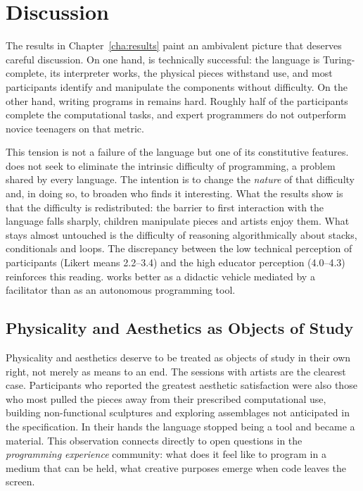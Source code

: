 
\chapter{Discussion}
\label{cha:discussion}

The results in Chapter~\ref{cha:results} paint an ambivalent picture that deserves careful discussion.
On one hand, \sculpt is technically successful: the language is Turing-complete, its interpreter works, the physical pieces withstand use, and most participants identify and manipulate the components without difficulty.
On the other hand, writing programs in \sculpt remains hard.
Roughly half of the participants complete the computational tasks, and expert programmers do not outperform novice teenagers on that metric.

This tension is not a failure of the language but one of its constitutive features.
\sculpt does not seek to eliminate the intrinsic difficulty of programming, a problem shared by every language.
The intention is to change the \emph{nature} of that difficulty and, in doing so, to broaden who finds it interesting.
What the results show is that the difficulty is redistributed: the barrier to first interaction with the language falls sharply, children manipulate pieces and artists enjoy them.
What stays almost untouched is the difficulty of reasoning algorithmically about stacks, conditionals and loops.
The discrepancy between the low technical perception of participants (Likert means 2.2--3.4) and the high educator perception (4.0--4.3) reinforces this reading.
\sculpt works better as a didactic vehicle mediated by a facilitator than as an autonomous programming tool.

\section{Physicality and Aesthetics as Objects of Study}
\label{sec:discussion:aesthetics}

Physicality and aesthetics deserve to be treated as objects of study in their own right, not merely as means to an end.
The sessions with artists are the clearest case.
Participants who reported the greatest aesthetic satisfaction were also those who most pulled the pieces away from their prescribed computational use, building non-functional sculptures and exploring assemblages not anticipated in the specification.
In their hands the language stopped being a tool and became a material.
This observation connects directly to open questions in the \emph{programming experience} community: what does it feel like to program in a medium that can be held, what creative purposes emerge when code leaves the screen.

